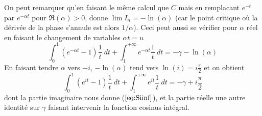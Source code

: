 \documentclass[a4paper,11pt]{article}
\begin{document}
\begin{giacjshere}
On peut remarquer qu'en faisant le m\^eme calcul que $C$ 
mais en remplacant $e^{-t}$ par $e^{-\alpha t}$ pour $\Re(\alpha)>0$, donne
$\lim I_n=-\ln(\alpha)$ (car le point critique o\`u la d\'eriv\'ee
de la phase s'annule est alors $1/\alpha$). Ceci peut aussi se v\'erifier
pour $\alpha$ r\'eel en faisant le changement de variables $\alpha t=u$
\[ \int_0^{1}(e^{-\alpha t}-1)\frac{1}{t} \ dt + \int_1^{+\infty} e^{-\alpha t} \frac{1}{t} \ dt 
= -\gamma -\ln(\alpha) \]
En faisant tendre $\alpha$ vers $-i$, $-\ln(\alpha)$ 
tend vers $\ln(i)=i\frac{\pi}{2}$ et on obtient
\[ \int_0^{1}(e^{it}-1)\frac{1}{t} \ dt + \int_1^{+\infty} e^{i t} \frac{1}{t} \ dt 
= -\gamma + i \frac{\pi}{2} \]
dont la partie imaginaire nous donne (\(\ref{eq:Siinf}\)), et la
partie r\'eelle une autre identit\'e sur $\gamma$ faisant intervenir
la fonction cosinus int\'egral.


\end{giacjshere}
\end{document}
